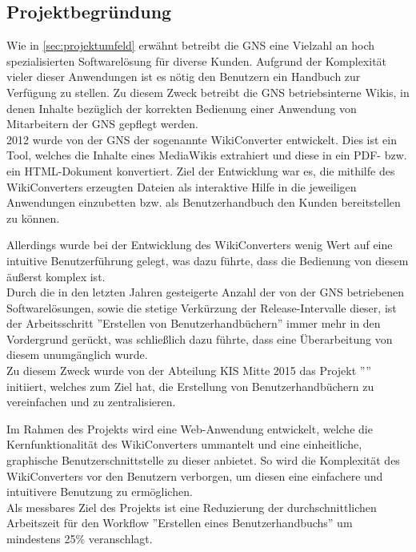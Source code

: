 \documentclass[12pt, xcolor=dvipsnames]{scrartcl}
\begin{document}
\subsection{Projektbegründung}
\label{sec:projektbegründung}

Wie in \ref{sec:projektumfeld} erwähnt betreibt die GNS eine Vielzahl an hoch spezialisierten Softwarelösung für diverse Kunden. Aufgrund der Komplexität vieler dieser Anwendungen ist es nötig den Benutzern ein Handbuch zur Verfügung zu stellen.
Zu diesem Zweck betreibt die GNS betriebsinterne Wikis, in denen Inhalte bezüglich der korrekten Bedienung einer Anwendung von Mitarbeitern der GNS gepflegt werden. \\

2012 wurde von der GNS der sogenannte WikiConverter entwickelt. Dies ist ein Tool, welches die Inhalte eines MediaWikis extrahiert und diese in ein PDF- bzw. ein HTML-Dokument konvertiert.
Ziel der Entwicklung war es, die mithilfe des WikiConverters erzeugten Dateien als interaktive Hilfe in die jeweiligen Anwendungen einzubetten bzw. als Benutzerhandbuch den Kunden bereitstellen zu können.

Allerdings wurde bei der Entwicklung des WikiConverters wenig Wert auf eine intuitive Benutzerführung gelegt, was dazu führte, dass die Bedienung von diesem äußerst komplex ist. \\

Durch die in den letzten Jahren gesteigerte Anzahl der von der GNS betriebenen Softwarelösungen, sowie die stetige Verkürzung der Release-Intervalle dieser, ist der Arbeitsschritt ''Erstellen von Benutzerhandbüchern'' immer mehr in den Vordergrund gerückt, was schließlich dazu führte, dass eine Überarbeitung von diesem unumgänglich wurde. \\

Zu diesem Zweck wurde von der Abteilung KIS Mitte 2015 das Projekt ''\Projekt'' initiiert, welches zum Ziel hat, die Erstellung von Benutzerhandbüchern zu vereinfachen und zu zentralisieren.

Im Rahmen des Projekts wird eine Web-Anwendung entwickelt, welche die Kernfunktionalität des WikiConverters ummantelt und eine einheitliche, graphische Benutzerschnittstelle zu dieser anbietet. So wird die Komplexität des WikiConverters vor den Benutzern verborgen, um diesen eine einfachere und intuitivere Benutzung zu ermöglichen. \\

Als messbares Ziel des Projekts ist eine Reduzierung der durchschnittlichen Arbeitszeit für den Workflow ''Erstellen eines Benutzerhandbuchs'' um mindestens 25\% veranschlagt.
\end{document}
